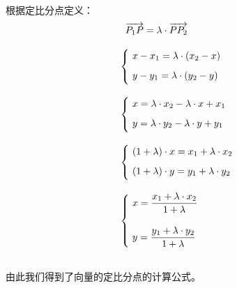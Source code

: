 \documentclass[UTF8]{ctexart}
\begin{document}
    根据定比分点定义：
    \begin{align}
        &~~\overrightarrow{P_1P}=\lambda\cdot\overrightarrow{PP_2}\\[3mm]
        &\begin{cases}
            ~x-x_1=\lambda\cdot(x_2-x)\\[2mm]
            ~y-y_1=\lambda\cdot(y_2-y)\vspace{2pt}
        \end{cases}\\[3mm]
        &\begin{cases}
            ~x=\lambda\cdot x_2-\lambda\cdot x+x_1\\[2mm]
            ~y=\lambda\cdot y_2-\lambda\cdot y+y_1\vspace{2pt}
        \end{cases}\\[3mm]
        &\begin{cases}
            ~(1+\lambda)\cdot x=x_1+\lambda\cdot x_2\\[2mm]
            ~(1+\lambda)\cdot y=y_1+\lambda\cdot y_2\vspace{2pt}
        \end{cases}\\[3mm]
        &\begin{cases}
            ~x=\dfrac{x_1+\lambda\cdot x_2}{1+\lambda}\\[6mm]
            ~y=\dfrac{y_1+\lambda\cdot y_2}{1+\lambda}\vspace{2pt}
        \end{cases}
    \end{align}\\[1mm]
    由此我们得到了向量的定比分点的计算公式。

\newpage
\end{document}
